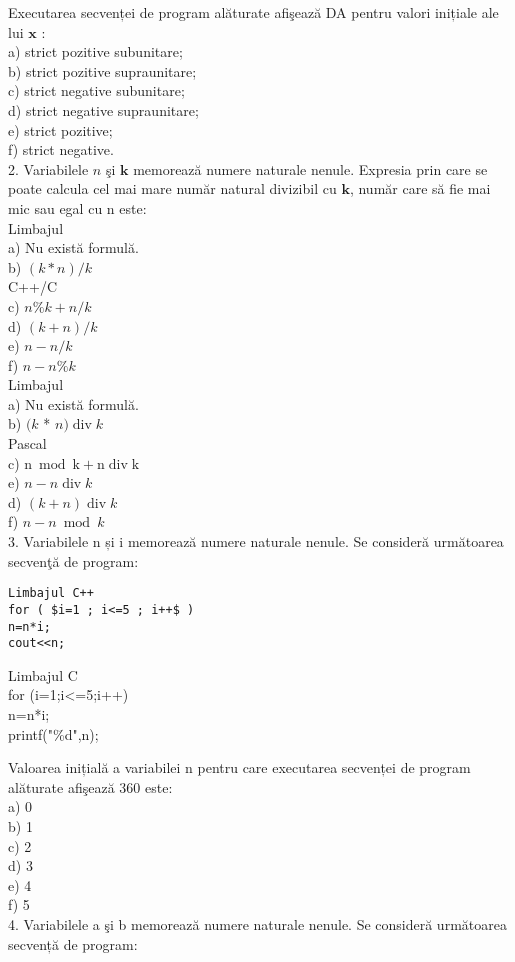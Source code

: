 Executarea secvenței de program alăturate afişează DA pentru valori inițiale ale lui $\mathbf{x}$ :\\
a) strict pozitive subunitare;\\
b) strict pozitive supraunitare;\\
c) strict negative subunitare;\\
d) strict negative supraunitare;\\
e) strict pozitive;\\
f) strict negative.\\
2. Variabilele $n$ şi $\mathbf{k}$ memorează numere naturale nenule. Expresia prin care se poate calcula cel mai mare număr natural divizibil cu $\mathbf{k}$, număr care să fie mai mic sau egal cu n este:\\
Limbajul\\
a) Nu există formulă.\\
b) $(k * n) / k$\\
C++/C\\
c) $n \% k+n / k$\\
d) $(k+n) / k$\\
e) $n-n / k$\\
f) $n-n \% k$\\
Limbajul\\
a) Nu există formulă.\\
b) $(k$ * $n) \operatorname{div} k$\\
Pascal\\
c) $\mathrm{n} \bmod \mathrm{k}+\mathrm{n} \operatorname{div} \mathrm{k}$\\
e) $n-n \operatorname{div} k$\\
d) $(k+n) \operatorname{div} k$\\
f) $n-n \bmod k$\\
3. Variabilele n și i memorează numere naturale nenule. Se consideră următoarea secvenţă de program:

\begin{verbatim}
Limbajul C++
for ( $i=1 ; i<=5 ; i++$ )
n=n*i;
cout<<n;
\end{verbatim}

Limbajul C\\
for (i=1;i<=5;i++)\\
n=n*i;\\
printf("\%d",n);

Valoarea inițială a variabilei n pentru care executarea secvenței de program alăturate afişează 360 este:\\
a) 0\\
b) 1\\
c) 2\\
d) 3\\
e) 4\\
f) 5\\
4. Variabilele a şi b memorează numere naturale nenule. Se consideră următoarea secvență de program:

